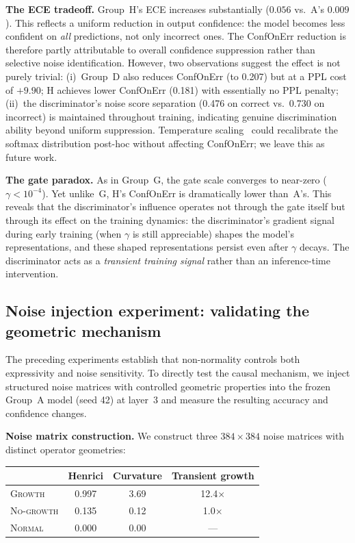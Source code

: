 \documentclass[11pt,a4paper]{article}
\theoremstyle{definition}
\begin{document}
\textbf{The ECE tradeoff.} Group~H's ECE increases
substantially ($0.056$ vs.\ A's $0.009$). This reflects
a uniform reduction in output confidence: the model
becomes less confident on \emph{all} predictions, not
only incorrect ones. The ConfOnErr reduction is therefore
partly attributable to overall confidence suppression
rather than selective noise identification. However, two
observations suggest the effect is not purely trivial:
(i)~Group~D also reduces ConfOnErr (to 0.207) but at a
PPL cost of $+9.90$; H achieves lower ConfOnErr (0.181)
with essentially no PPL penalty; (ii)~the discriminator's
noise score separation (0.476 on correct vs.\ 0.730 on
incorrect) is maintained throughout training, indicating
genuine discrimination ability beyond uniform suppression.
Temperature scaling~\cite{guo2017calibration} could
recalibrate the softmax distribution post-hoc without
affecting ConfOnErr; we leave this as future work.

\textbf{The gate paradox.} As in Group~G, the gate scale
converges to near-zero ($\gamma < 10^{-4}$). Yet unlike~G,
H's ConfOnErr is dramatically lower than~A's. This reveals
that the discriminator's influence operates not through
the gate itself but through its effect on the training
dynamics: the discriminator's gradient signal during early
training (when $\gamma$ is still appreciable) shapes the
model's representations, and these shaped representations
persist even after $\gamma$ decays. The discriminator acts
as a \emph{transient training signal} rather than an
inference-time intervention.

\subsection{Noise injection experiment: validating the geometric mechanism}
\label{sec:noise-injection}

The preceding experiments establish that non-normality controls both
expressivity and noise sensitivity. To directly test the causal
mechanism, we inject structured noise matrices with controlled
geometric properties into the frozen Group~A model (seed 42) at
layer~3 and measure the resulting accuracy and confidence changes.

\textbf{Noise matrix construction.} We construct three
$384 \times 384$ noise matrices with distinct operator geometries:

\begin{center}
\begin{tabular}{lccc}
 & Henrici & Curvature & Transient growth \\
\midrule
\textsc{Growth}    & 0.997 & 3.69 & 12.4$\times$ \\
\textsc{No-growth} & 0.135 & 0.12 & 1.0$\times$ \\
\textsc{Normal}    & 0.000 & 0.00 & --- \\
\end{tabular}
\end{center}
\end{document}
